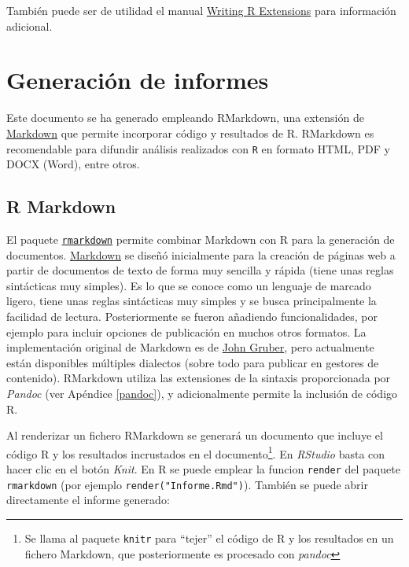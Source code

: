 \documentclass[
]{book}
\theoremstyle{break}
\theoremstyle{nonumberplain}
\begin{document}
También puede ser de utilidad el manual \href{http://colinfay.me/writing-r-extensions}{Writing R Extensions} para información adicional.

\hypertarget{informes}{%
\chapter{Generación de informes}\label{informes}}

Este documento se ha generado empleando RMarkdown, una extensión de \href{https://es.wikipedia.org/wiki/Markdown}{Markdown} que permite incorporar código y resultados de R.
RMarkdown es recomendable para difundir análisis realizados con \texttt{R} en formato HTML, PDF y DOCX (Word), entre otros.

\hypertarget{r-markdown}{%
\section{R Markdown}\label{r-markdown}}

El paquete \href{https://github.com/rstudio/rmarkdown}{\texttt{rmarkdown}} permite combinar Markdown con R para la generación de documentos. \href{http://daringfireball.net/projects/markdown/}{Markdown} se diseñó inicialmente para la creación de páginas web a partir de documentos de texto de forma muy sencilla y rápida (tiene unas reglas sintácticas muy simples).
Es lo que se conoce como un lenguaje de marcado ligero, tiene unas reglas sintácticas muy simples y se busca principalmente la facilidad de lectura.
Posteriormente se fueron añadiendo funcionalidades, por ejemplo para incluir opciones de publicación en muchos otros formatos.
La implementación original de Markdown es de \href{http://daringfireball.net/projects/markdown/}{John Gruber},
pero actualmente están disponibles múltiples dialectos (sobre todo para publicar en gestores de contenido).
RMarkdown utiliza las extensiones de la sintaxis proporcionada por \emph{Pandoc} (ver Apéndice \ref{pandoc}), y adicionalmente permite la inclusión de código R.

Al renderizar un fichero RMarkdown se generará un documento que incluye el código R y los resultados incrustados en el documento\footnote{Se llama al paquete \texttt{knitr} para ``tejer'' el código de R y los resultados en un fichero Markdown, que posteriormente es procesado con \emph{pandoc}}.
En \emph{RStudio} basta con hacer clic en el botón \emph{Knit}.
En R se puede emplear la funcion \texttt{render} del paquete \texttt{rmarkdown} (por ejemplo \texttt{render("Informe.Rmd")}).
También se puede abrir directamente el informe generado:
\end{document}
